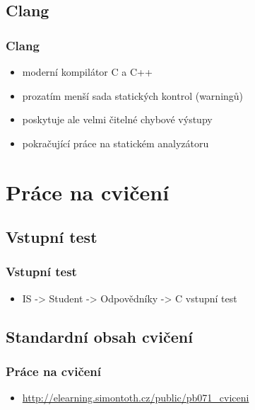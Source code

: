 	\subsection{Clang}

	\begin{frame}
		\frametitle{Clang}
		\begin{itemize}
			\item{moderní kompilátor C a C++}
			\item{prozatím menší sada statických kontrol (warningů)}
			\item{poskytuje ale velmi čitelné chybové výstupy}
			\item{pokračující práce na statickém analyzátoru}
	\end{itemize}
\end{frame}

\section{Práce na cvičení}
\subsection{Vstupní test}

\begin{frame}
	\frametitle{Vstupní test}
	\begin{itemize}
		\item{IS -> Student -> Odpovědníky -> C vstupní test}
	\end{itemize}
\end{frame}

\subsection{Standardní obsah cvičení}

\begin{frame}
	\frametitle{Práce na cvičení}
	\begin{itemize}
		\item{\href{http://elearning.simontoth.cz/public/pb071\_cviceni}{http://elearning.simontoth.cz/public/pb071\_cviceni}}
	\end{itemize}
\end{frame}




